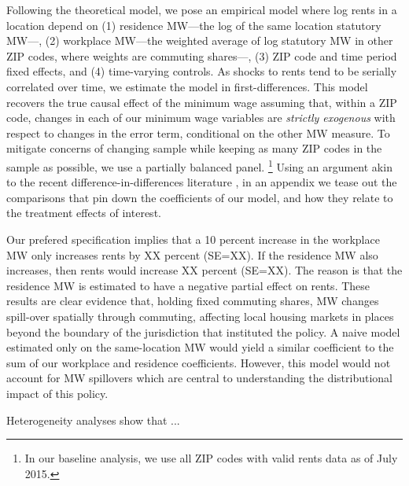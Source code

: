 Following the theoretical model, we pose an empirical model where log rents in 
a location depend on 
(1) residence MW---the log of the same location statutory MW---,
(2) workplace MW---the weighted average of log statutory MW in other ZIP codes,
where weights are commuting shares---,
(3)  ZIP code and time period fixed effects,
and 
(4) time-varying controls.
As shocks to rents tend to be serially correlated over time, we estimate the model 
in first-differences.
This model recovers the true causal effect of the minimum wage assuming that, 
within a ZIP code, changes in each of our minimum wage variables are 
\textit{strictly exogenous} with respect to changes in the error term, conditional
on the other MW measure.
To mitigate concerns of changing sample while keeping as many ZIP codes in the sample
as possible, we use a partially balanced panel.%
\footnote{In our baseline analysis, we use all ZIP codes with valid rents data
as of July 2015.}
Using an argument akin to the recent difference-in-differences literature
\parencite[e.g.,][]{CallawaySantAnna2021,CallawayEtAl2021}, 
in an appendix we tease out the comparisons that pin down the coefficients of our 
model, and how they relate to the treatment effects of interest.


Our prefered specification implies that a 10 percent increase in the workplace MW
only increases rents by XX percent (SE=XX).
If the residence MW also increases, then rents would increase XX percent (SE=XX).
The reason is that the residence MW is estimated to have a negative partial effect
on rents.
These results are clear evidence that, holding fixed commuting shares, MW changes 
spill-over spatially through commuting, affecting local housing markets in places
beyond the boundary of the jurisdiction that instituted the policy.
A naive model estimated only on the same-location MW would yield a similar coefficient
to the sum of our workplace and residence coefficients.
However, this model would not account for MW spillovers which are central to 
understanding the distributional impact of this policy.

Heterogeneity analyses show that ...


